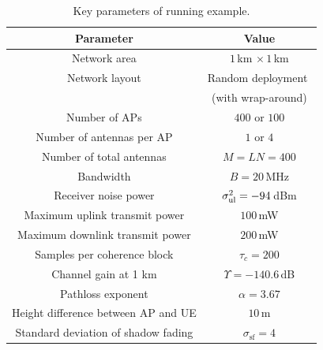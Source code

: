 \begin{table}[t]
	\renewcommand{\arraystretch}{1.}
	\centering
	\begin{tabular}{|c|c|}
		\hline \bfseries $\!\!\!\!\!$ Parameter $\!\!\!\!\!$ & \bfseries Value\\
		\hline\hline
				Network area &  $1$\,km $ \times\,  1$\,km \\
					Network layout & $\!$Random deployment $\!$ \\
				& (with wrap-around) \\
				Number of APs &  $400$ or $100$ \\
				Number of antennas per AP  & $1$ or $4$ \\
		Number of total antennas & $M=LN=400$ \\
				Bandwidth & $B = 20$\,MHz  \\
		
		Receiver noise power & $\sigma^2_{\mathrm{ul}} = -94$\,dBm \\
		
		Maximum uplink transmit power  & $100$\,mW\\
		Maximum downlink transmit power & $200$\,mW\\
		Samples per coherence block & $\tau_c = 200$ \\
		
		Channel gain at 1 km & $\Upsilon = -140.6$\,dB \\
		
		Pathloss exponent & $\alpha = 3.67$ \\
		Height difference between AP and UE & $10$\,m \\
		
		$\!$Standard deviation of shadow fading$\!$  & $\sigma_{\mathrm{sf}}= 4$ \\
		
		\hline
	\end{tabular}
	\caption{Key parameters of running example.}
	\label{tab:system_parameters_running_example}
\end{table}

\enlargethispage{\baselineskip} 

